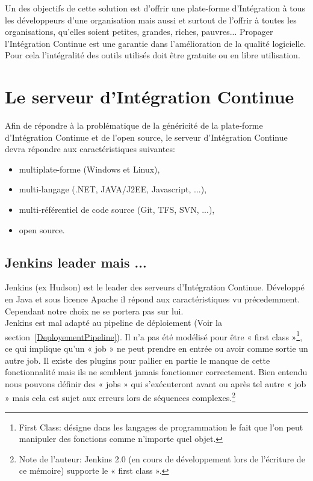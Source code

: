   Un des objectifs de cette solution est d'offrir une plate-forme d'Intégration à tous les développeurs d'une organisation mais aussi et surtout de l'offrir à toutes les organisations, qu'elles soient petites, grandes, riches, pauvres... Propager l'Intégration Continue est une garantie dans l'amélioration de la qualité logicielle. Pour cela l'intégralité des outils utilisés doit être gratuite ou en libre utilisation.

  \section{Le serveur d’Intégration Continue}
  Afin de répondre à la problématique de la généricité de la plate-forme d'Intégration Continue et de l'open source, le serveur d'Intégration Continue devra répondre aux caractéristiques suivantes:\\

  \begin{itemize}
    \item multiplate-forme (Windows et Linux),
    \item multi-langage (.NET, JAVA/J2EE, Javascript, ...),
    \item multi-référentiel de code source (Git, TFS, SVN, ...),
    \item open source.\\
  \end{itemize}

    \subsection{Jenkins leader mais ...}
    Jenkins (ex Hudson) est le leader des serveurs d'Intégration Continue. Développé en Java et sous licence Apache il répond aux caractéristiques vu précedemment. Cependant notre choix ne se portera pas sur lui.\\

    Jenkins est mal adapté au pipeline de déploiement (Voir la section~\ref{DeployementPipeline}). Il n’a pas été modélisé pour être « \gls{first class} »\footnote{First Class: désigne dans les langages de programmation le fait que l'on peut manipuler des fonctions comme n'importe quel objet.}, ce qui implique qu'un « job » ne peut prendre en entrée ou avoir comme sortie un autre job. Il existe des plugins pour pallier en partie le manque de cette fonctionnalité mais ils ne semblent jamais fonctionner correctement. Bien entendu nous pouvons définir des « jobs » qui s’exécuteront avant ou après tel autre « job » mais cela est sujet aux erreurs lors de séquences complexes.\footnote{Note de l'auteur: Jenkins 2.0 (en cours de développement lors de l'écriture de ce mémoire) supporte le « first class ».}\\

